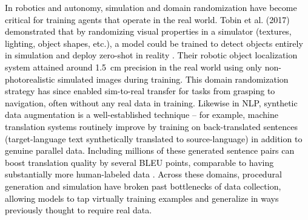 \documentclass{article}
\newcommand{\gpt}[1]{\textcolor{black}{#1}}
\begin{document}
\gpt{ In robotics and autonomy, simulation and domain randomization have become critical for training agents that operate in the real world. Tobin et al. (2017) demonstrated that by randomizing visual properties in a simulator (textures, lighting, object shapes, etc.), a model could be trained to detect objects entirely in simulation and deploy zero-shot in reality \cite{tobin2017domain}. Their robotic object localization system attained around \SI{1.5}{\centi\metre} precision in the real world using only non-photorealistic simulated images during training. This domain randomization strategy has since enabled sim-to-real transfer for tasks from grasping to navigation, often without any real data in training. Likewise in NLP, synthetic data augmentation is a well-established technique – for example, machine translation systems routinely improve by training on back-translated sentences (target-language text synthetically translated to source-language) in addition to genuine parallel data. Including millions of these generated sentence pairs can boost translation quality by several BLEU points, comparable to having substantially more human-labeled data \cite{sennrich-etal-2016-improving,edunov-etal-2018-understanding,mcnamee-duh-2023-extensive,reheman-etal-2024-exploiting}.
Across these domains, procedural generation and simulation have broken past bottlenecks of data collection, allowing models to tap virtually   training examples and generalize in ways previously thought to require real data.}
\end{document}

